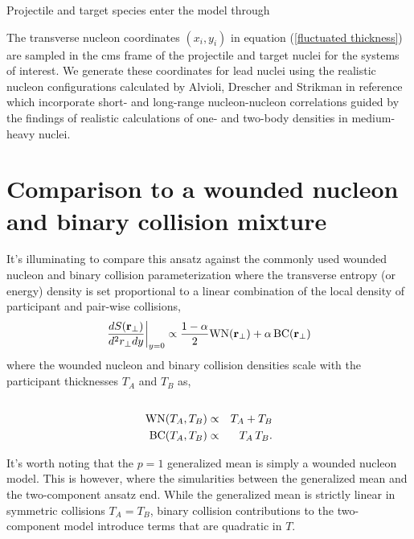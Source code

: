 \documentclass[aps,prl,reprint,amsmath,nofootinbib]{revtex4-1}
\begin{document}
Projectile and target species enter the model through 


The transverse nucleon coordinates $(x_i,y_i)$ in equation (\ref{fluctuated thickness}) are sampled in the cms frame of the projectile and target nuclei for the systems of interest. We generate
these coordinates for lead nuclei using the realistic nucleon configurations calculated by Alvioli, Drescher and Strikman in reference \cite{nucleon-correlations} which incorporate short- 
and long-range nucleon-nucleon correlations guided by the findings of realistic calculations of one- and two-body densities in medium-heavy nuclei.


\section{Comparison to a wounded nucleon and binary collision mixture}

It's illuminating to compare this ansatz against the commonly used wounded nucleon and binary collision parameterization where the transverse entropy (or energy) density 
is set proportional to a linear combination of the local density of participant and pair-wise collisions,
\begin{equation}
 \frac{dS({\bf r}_\perp)}{d^2r_\perp dy} \biggr \rvert_{y=0}  \propto \frac{1-\alpha}{2}\mbox{WN}({\bf r_\perp}) + \alpha\, \mbox{BC}({\bf r_\perp}) 
\end{equation}
where the wounded nucleon and binary collision densities scale with the participant thicknesses $T_A$ and $T_B$ as,
\begin{eqnarray}
 \cr \mbox{WN}(T_A,T_B) &\propto& T_A + T_B \\
 \label{binary collisions}
 \mbox{BC}(T_A,T_B) &\propto& T_A\,T_B.
\end{eqnarray}

It's worth noting that the $p=1$ generalized mean is simply a wounded nucleon model. This is however, where the simularities between the generalized
mean and the two-component ansatz end. While the generalized mean is strictly linear in symmetric collisions $T_A=T_B$, binary collision contributions to the 
two-component model introduce terms that are quadratic in $T$.

\end{document}
